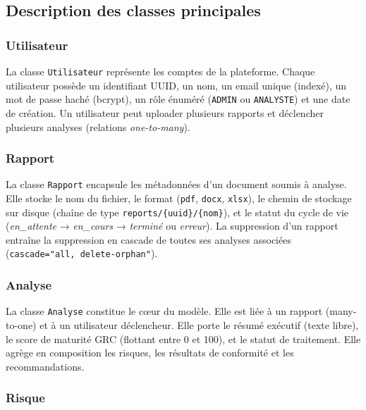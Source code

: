 \subsection{Description des classes principales}

\subsubsection*{Utilisateur}

La classe \texttt{Utilisateur} représente les comptes de la plateforme.
Chaque utilisateur possède un identifiant UUID, un nom, un email unique
(indexé), un mot de passe haché (bcrypt), un rôle énuméré
(\texttt{ADMIN} ou \texttt{ANALYSTE}) et une date de création.
Un utilisateur peut uploader plusieurs rapports et déclencher plusieurs
analyses (relations \textit{one-to-many}).

\subsubsection*{Rapport}

La classe \texttt{Rapport} encapsule les métadonnées d'un document soumis
à analyse. Elle stocke le nom du fichier, le format (\texttt{pdf},
\texttt{docx}, \texttt{xlsx}), le chemin de stockage sur disque (chaîne
de type \texttt{reports/\{uuid\}/\{nom\}}), et le statut du cycle de vie
(\textit{en\_attente} → \textit{en\_cours} → \textit{terminé} ou
\textit{erreur}). La suppression d'un rapport entraîne la suppression
en cascade de toutes ses analyses associées
(\texttt{cascade="all, delete-orphan"}).

\subsubsection*{Analyse}

La classe \texttt{Analyse} constitue le cœur du modèle. Elle est liée à
un rapport (many-to-one) et à un utilisateur déclencheur. Elle porte le
résumé exécutif (texte libre), le score de maturité GRC (flottant entre
0 et 100), et le statut de traitement. Elle agrège en composition les
risques, les résultats de conformité et les recommandations.

\subsubsection*{Risque}

